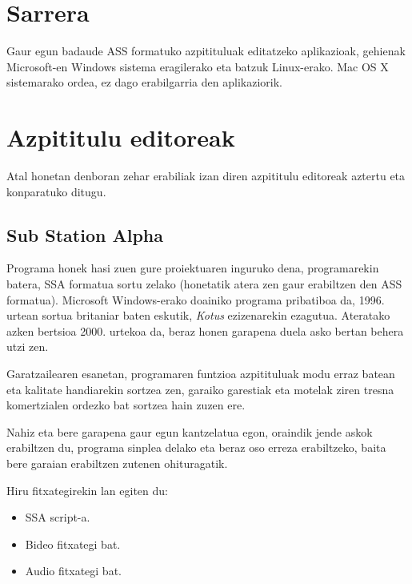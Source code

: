 
\section{Sarrera}
Gaur egun badaude ASS formatuko azpitituluak editatzeko aplikazioak, gehienak Microsoft-en Windows sistema eragilerako eta batzuk Linux-erako. Mac OS X sistemarako ordea, ez dago erabilgarria den aplikaziorik.
\section{Azpititulu editoreak}
Atal honetan denboran zehar erabiliak izan diren azpititulu editoreak aztertu eta konparatuko ditugu.
\subsection{Sub Station Alpha}
Programa honek hasi zuen gure proiektuaren inguruko dena, programarekin batera, SSA formatua sortu zelako (honetatik atera zen gaur erabiltzen den ASS formatua). Microsoft Windows-erako doainiko programa pribatiboa da, 1996. urtean sortua britaniar baten eskutik, \textit{Kotus} ezizenarekin ezagutua. Ateratako azken bertsioa 2000. urtekoa da, beraz honen garapena duela asko bertan behera utzi zen.

Garatzailearen esanetan, programaren funtzioa azpitituluak modu erraz batean eta kalitate handiarekin sortzea zen, garaiko garestiak eta motelak ziren tresna komertzialen ordezko bat sortzea hain zuzen ere.

Nahiz eta bere garapena gaur egun kantzelatua egon, oraindik jende askok erabiltzen du, programa sinplea delako eta beraz oso erreza erabiltzeko, baita bere garaian erabiltzen zutenen ohituragatik.

Hiru fitxategirekin lan egiten du:
\begin{itemize}
\item SSA script-a.
\item Bideo fitxategi bat.
\item Audio fitxategi bat.
\end{itemize}

